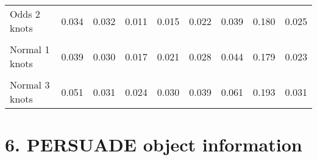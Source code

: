 \documentclass[
]{article}
\begin{document}
\begin{table}[H]
{\begin{tabular}[t]{lrrrrrrrr}
Odds 2 knots & 0.034 & 0.032 & 0.011 & 0.015 & 0.022 & 0.039 & 0.180 & 0.025\\
\cellcolor{gray!10}{Odds 3 knots} & \cellcolor{gray!10}{0.040} & \cellcolor{gray!10}{0.034} & \cellcolor{gray!10}{0.013} & \cellcolor{gray!10}{0.018} & \cellcolor{gray!10}{0.026} & \cellcolor{gray!10}{0.047} & \cellcolor{gray!10}{0.193} & \cellcolor{gray!10}{0.030}\\
Normal 1 knots & 0.039 & 0.030 & 0.017 & 0.021 & 0.028 & 0.044 & 0.179 & 0.023\\
\cellcolor{gray!10}{Normal 2 knots} & \cellcolor{gray!10}{0.040} & \cellcolor{gray!10}{0.030} & \cellcolor{gray!10}{0.018} & \cellcolor{gray!10}{0.022} & \cellcolor{gray!10}{0.029} & \cellcolor{gray!10}{0.046} & \cellcolor{gray!10}{0.177} & \cellcolor{gray!10}{0.024}\\
Normal 3 knots & 0.051 & 0.031 & 0.024 & 0.030 & 0.039 & 0.061 & 0.193 & 0.031\\
\bottomrule
\end{tabular}}
\end{table}

\clearpage

\section{6. PERSUADE object
information}\label{persuade-object-information}
\end{document}
